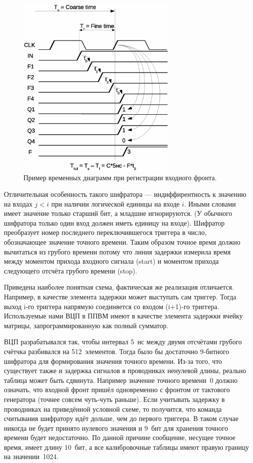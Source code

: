 \begin{figure}[H]
\centering
\includegraphics[width=0.7\textwidth]{pictures/TDC_diag.eps}
\caption{Пример временных диаграмм при регистрации входного фронта.}
\label{fig:TDCtimeDiag}
\end{figure}

Отличительная особенность такого шифратора --- индиффирентность к значению на входах $ j<i $ при наличии логической единицы на входе $ i $. Иными словами имеет значение только старший бит, а младшие игнорируются. (У обычного шифратора только один вход должен иметь единицу на входе). Шифратор преобразует номер последнего переключившегося триггера в число, обозначающее значение точного времени. Таким образом точное время должно вычитаться из грубого времени потому что линия задержки измерила время между моментом прихода входного сигнала (start) и моментом прихода следующего отсчёта грубого времени (stop).

Приведена наиболее понятная схема, фактическая же реализация отличается. Например, в качестве элемента задержки может выступать сам триггер. Тогда выход i-го триггера напрямую соединяется со входом (i+1)-го триггера. Используемые нами ВЦП в ППВМ имеют в качестве элемента задержки ячейку матрицы, запрограммированную как полный сумматор.

ВЦП разрабатывался так, чтобы интервал 5~нс между двумя отсчётами грубого счётчка разбивался на 512~элементов. Тогда было бы достаточно 9-битного шифратора для формирования значения точного времени. Из-за того, что существует также и задержка сигналов в проводниках ненулевой длины, реально таблица может быть сдвинута. Например значение точного времени~0 должно означать, что входной фронт пришёл одновременно с фронтом от тактового генератора (точнее совсем чуть-чуть раньше). Если учитывать задержку в проводниках на приведённой условной схеме, то получится, что команда считывания шифратору идёт дольше, чем до первого триггера. В таком случае никогда не будет принято нулевого значения и 9~бит для хранения точного времени будет недостаточно. По данной причине сообщение, несущее точное время, имеет длину 10~бит, а все калибровочные таблицы имеют правую границу на значении~1024.


